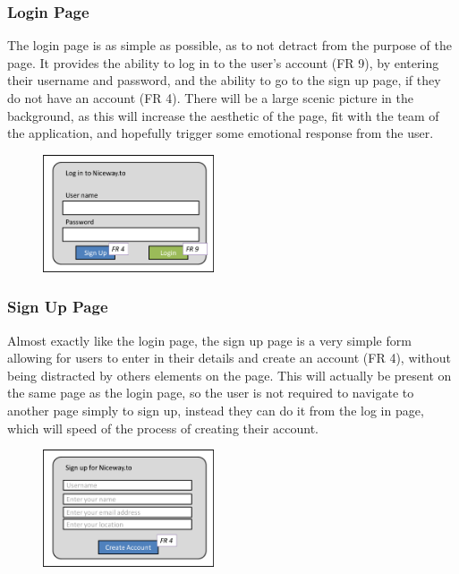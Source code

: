 \documentclass[a4paper,twoside,notitlepage,11pt]{article}
\begin{document}
\subsubsection{Login Page}
The login page is as simple as possible, as to not detract from the purpose of the page. It provides the ability to log in to the user's account (FR 9), by entering their username and password, and the ability to go to the sign up page, if they do not have an account (FR 4). There will be a large scenic picture in the background, as this will increase the aesthetic of the page, fit with the team of the application, and hopefully trigger some emotional response from the user.
\begin{figure}[!ht]
	\begin{center}
		\includegraphics[width=0.45\textwidth]{images/ui-login.png}
	\end{center}
	\vspace{-6mm}
\end{figure}

\subsubsection{Sign Up Page}
Almost exactly like the login page, the sign up page is a very simple form allowing for users to enter in their details and create an account (FR 4), without being distracted by others elements on the page. This will actually be present on the same page as the login page, so the user is not required to navigate to another page simply to sign up, instead they can do it from the log in page, which will speed of the process of creating their account.
\begin{figure}[!ht]
	\begin{center}
		\includegraphics[width=0.45\textwidth]{images/ui-signup.png}
	\end{center}
	\vspace{-6mm}
\end{figure}
\end{document}
